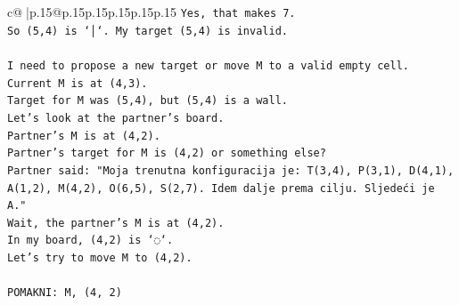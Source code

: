 \documentclass{article}
\begin{document}
{\begin{supertabular}{c@{$\;$}|p{.15\linewidth}@{}p{.15\linewidth}p{.15\linewidth}p{.15\linewidth}p{.15\linewidth}p{.15\linewidth}}
{{{\texttt{Yes, that makes 7.} \\
\texttt{So (5,4) is `│`. My target (5,4) is invalid.} \\
\\ 
\texttt{I need to propose a new target or move M to a valid empty cell.} \\
\texttt{Current M is at (4,3).} \\
\texttt{Target for M was (5,4), but (5,4) is a wall.} \\
\texttt{Let's look at the partner's board.} \\
\texttt{Partner's M is at (4,2).} \\
\texttt{Partner's target for M is (4,2) or something else?} \\
\texttt{Partner said: "Moja trenutna konfiguracija je: T(3,4), P(3,1), D(4,1), A(1,2), M(4,2), O(6,5), S(2,7). Idem dalje prema cilju. Sljedeći je A."} \\
\texttt{Wait, the partner's M is at (4,2).} \\
\texttt{In my board, (4,2) is `◌`.} \\
\texttt{Let's try to move M to (4,2).} \\
\\ 
\texttt{POMAKNI: M, (4, 2)} \\
            }
        }
    }
     \\ \\


\end{supertabular}}
\end{document}
